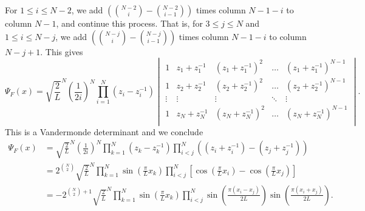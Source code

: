 \documentclass[a4paper,11pt]{article}
\numberwithin{equation}{section}
\begin{document}
	For $1\leq i\leq N-2 $, we add $ \left(\binom{N-2}{i}-\binom{N-2}{i-1}\right) $ times column $ N-1-i $ to column $ N-1 $, and continue this process. That is, for $3\leq j\leq N$ and $1\leq i\leq N-j $, we add  $ \left(\binom{N-j}{i}-\binom{N-j}{i-1}\right) $ times column $ N-1-i $ to column $ N-j+1 $. This gives \begin{equation}
		\Psi_F(x)=\sqrt{\frac{2}{L}}^N\left(\frac{1}{2i}\right)^N\prod_{i=1}^{N}(z_i-z_i^{-1})\begin{vmatrix}
			1&z_1+z_1^{-1}&(z_1+z_1^{-1})^2&\ldots&(z_1+z_1^{-1})^{N-1}\\
			1&z_2+z_2^{-1}&(z_2+z_2^{-1})^2&\ldots&(z_2+z_2^{-1})^{N-1}\\
			\vdots&\vdots&\vdots&\ddots&\vdots\\
			1&z_N+z_N^{-1}&(z_N+z_N^{-1})^2&\ldots&(z_N+z_N^{-1})^{N-1}\\
		\end{vmatrix}.
	\end{equation}
	This is a Vandermonde determinant and we conclude \begin{equation}
		\begin{aligned}
			\Psi_F(x)&=\sqrt{\frac{2}{L}}^N\left(\frac{1}{2i}\right)^N\prod_{k=1}^{N}(z_k-z_k^{-1})\prod_{i<j}^{N}\left((z_i+z_i^{-1})-(z_j+z_j^{-1})\right)\\
			&=2^{\binom{N}{2}}\sqrt{\frac{2}{L}}^N\prod_{k=1}^{N}\sin\left(\frac{\pi}{L}x_k\right)\prod_{i<j}^{N}\left[\cos\left(\frac{\pi}{L}x_i\right)-\cos\left(\frac{\pi}{L}x_j\right)\right]\\
			&=-2^{\binom{N}{2}+1}\sqrt{\frac{2}{L}}^N\prod_{k=1}^{N}\sin\left(\frac{\pi}{L}x_k\right)\prod_{i<j}^{N}\sin\left(\frac{\pi(x_i-x_j)}{2L}\right)\sin\left(\frac{\pi(x_i+x_j)}{2L}\right)
			.
		\end{aligned}
	\end{equation}
	
\end{document}
